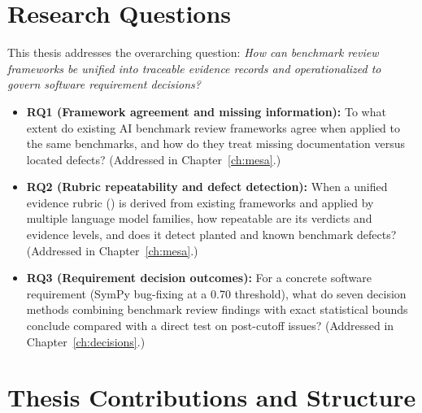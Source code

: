 \section{Research Questions}
\label{sec:intro_rqs}

This thesis addresses the overarching question: \emph{How can benchmark review frameworks be unified into traceable evidence records and operationalized to govern software requirement decisions?}

\begin{itemize}
    \item \textbf{RQ1 (Framework agreement and missing information):} To what extent do existing AI benchmark review frameworks agree when applied to the same benchmarks, and how do they treat missing documentation versus located defects? (Addressed in Chapter~\ref{ch:mesa}.)
    \item \textbf{RQ2 (Rubric repeatability and defect detection):} When a unified evidence rubric (\mesa{}) is derived from existing frameworks and applied by multiple language model families, how repeatable are its verdicts and evidence levels, and does it detect planted and known benchmark defects? (Addressed in Chapter~\ref{ch:mesa}.)
    \item \textbf{RQ3 (Requirement decision outcomes):} For a concrete software requirement (SymPy bug-fixing at a 0.70 threshold), what do seven decision methods combining benchmark review findings with exact statistical bounds conclude compared with a direct test on post-cutoff issues? (Addressed in Chapter~\ref{ch:decisions}.)
\end{itemize}

\section{Thesis Contributions and Structure}
\label{sec:intro_contributions}

